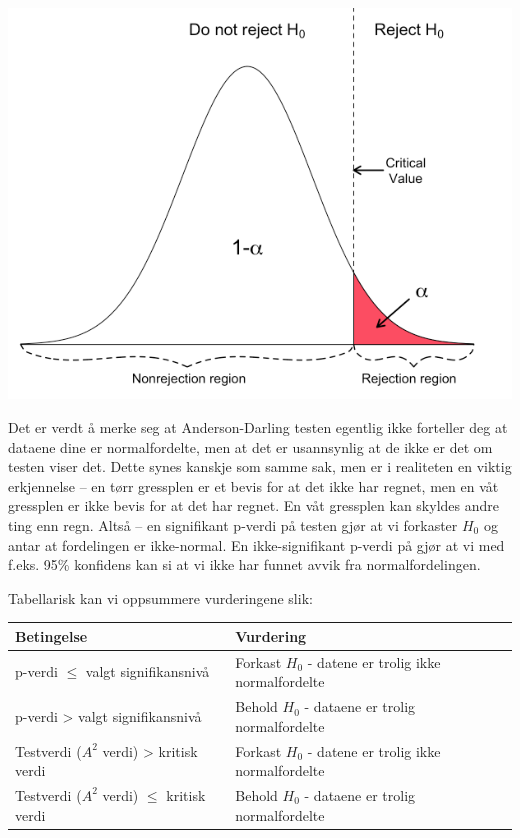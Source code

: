 \documentclass[
]{article}
\begin{document}
\includegraphics{Hartman1.png}

Det er verdt å merke seg at Anderson-Darling testen egentlig ikke forteller deg at dataene dine er normalfordelte, men at det er usannsynlig at de ikke er det om testen viser det. Dette synes kanskje som samme sak, men er i realiteten en viktig erkjennelse -- en tørr gressplen er et bevis for at det ikke har regnet, men en våt gressplen er ikke bevis for at det har regnet. En våt gressplen kan skyldes andre ting enn regn. Altså -- en signifikant p-verdi på testen gjør at vi forkaster \(H_0\) og antar at fordelingen er ikke-normal. En ikke-signifikant p-verdi på gjør at vi med f.eks. 95\% konfidens kan si at vi ikke har funnet avvik fra normalfordelingen.

Tabellarisk kan vi oppsummere vurderingene slik:

\begin{table}[!h]
\centering
\begin{tabular}{l|l}
\hline
Betingelse & Vurdering\\
\hline
p-verdi $\le$ valgt signifikansnivå & Forkast $H_0$ - datene er trolig ikke normalfordelte\\
\hline
p-verdi > valgt signifikansnivå & Behold $H_0$ - dataene er trolig normalfordelte\\
\hline
Testverdi ($A^2$ verdi) > kritisk verdi & Forkast $H_0$ - datene er trolig ikke normalfordelte\\
\hline
Testverdi ($A^2$ verdi) $\le$ kritisk verdi & Behold $H_0$ - dataene er trolig normalfordelte\\
\hline
\end{tabular}
\end{table}
\end{document}
